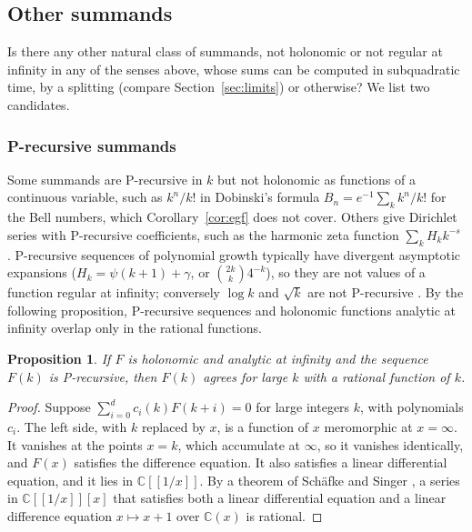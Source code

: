 \documentclass[11pt,reqno]{amsart}
\newtheorem{proposition}[theorem]{Proposition}
\theoremstyle{definition}
\theoremstyle{remark}
\newcommand{\CC}{\mathbb{C}}
\begin{document}
\subsection{Other summands}\label{sec:openother}
Is there any other natural class of summands, not holonomic or not regular at infinity in any of the senses above,
whose sums can be computed in subquadratic time, by a splitting (compare Section~\ref{sec:limits}) or otherwise? We
list two candidates.

\subsubsection{P-recursive summands} Some summands are P-recursive in $k$ but not holonomic as functions of a
continuous variable, such as $k^n/k!$ in Dobinski's formula $B_n = e^{-1}\sum_kk^n/k!$ for the Bell numbers, which
Corollary~\ref{cor:egf} does not cover. Others give Dirichlet series with P-recursive coefficients, such as the
harmonic zeta function $\sum_kH_kk^{-s}$ \cite{AV84,CC20}. P-recursive sequences of polynomial growth typically have
divergent asymptotic expansions ($H_k = \psi(k+1) + \gamma$, or $\binom{2k}{k}4^{-k}$), so they are not values of a
function regular at infinity; conversely $\log k$ and $\sqrt k$ are not P-recursive \cite{FGS05}. By the following
proposition, P-recursive sequences and holonomic functions analytic at infinity overlap only in the rational
functions.

\begin{proposition}\label{prop:precursive}
If $F$ is holonomic and analytic at infinity and the sequence $F(k)$ is P-recursive, then $F(k)$ agrees for large $k$
with a rational function of $k$.
\end{proposition}

\begin{proof}
Suppose $\sum_{i=0}^dc_i(k)F(k+i) = 0$ for large integers $k$, with polynomials $c_i$. The left side, with $k$
replaced by $x$, is a function of $x$ meromorphic at $x = \infty$. It vanishes at the points $x = k$, which accumulate
at $\infty$, so it vanishes identically, and $F(x)$ satisfies the difference equation. It also satisfies a linear differential equation, and it lies in
$\CC[[1/x]]$. By a theorem of Sch\"afke and Singer \cite[Corollary~5]{SS19}, a series in $\CC[[1/x]][x]$ that
satisfies both a linear differential equation and a linear difference equation $x \mapsto x+1$ over $\CC(x)$ is
rational.
\end{proof}
\end{document}
